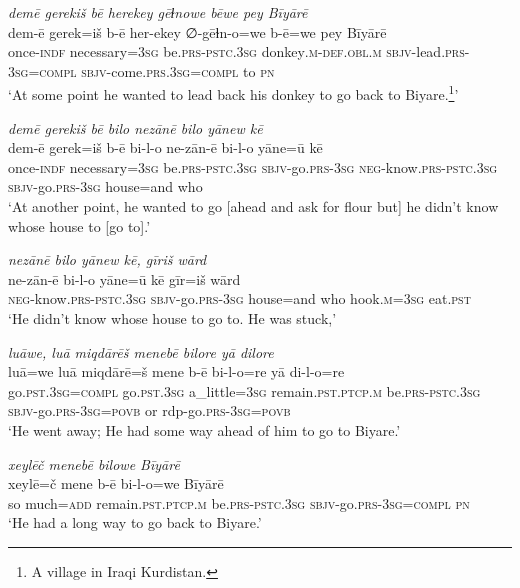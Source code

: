 \ea \label{HB.25}
\textit{demē gerekiš bē herekey gēɫnowe bēwe pey Bīyārē} \\ 
\gll dem-ē gerek=iš b-ē her-ekey ∅-gēɫn-o=we b-ē=we pey Bīyārē \\ 
 once\textsc{-indf} necessary\textsc{=3sg} be\textsc{.prs}\textsc{-pstc}\textsc{.3sg} donkey\textsc{.m}\textsc{-def}\textsc{.obl}\textsc{.m} \textsc{sbjv-}lead\textsc{.prs}\textsc{-3sg}\textsc{=\textsc{compl}} \textsc{sbjv-}come\textsc{.prs}\textsc{.3sg}\textsc{=\textsc{compl}} to \textsc{pn} \\ 
\glt `At some point he wanted to lead back his donkey to go back to Biyare.\footnote{A village in Iraqi Kurdistan.}'
\z 
 
\ea \label{HB.26}
\textit{demē gerekiš bē bilo nezānē bilo yānew kē} \\ 
\gll dem-ē gerek=iš b-ē bi-l-o ne-zān-ē bi-l-o yāne=ū kē \\ 
 once\textsc{-indf} necessary\textsc{=3sg} be\textsc{.prs}\textsc{-pstc}\textsc{.3sg} \textsc{sbjv-}go\textsc{.prs}\textsc{-3sg} \textsc{neg-}know\textsc{.prs}\textsc{-pstc}\textsc{.3sg} \textsc{sbjv-}go\textsc{.prs}\textsc{-3sg} house=and who \\ 
\glt `At another point, he wanted to go [ahead and ask for flour but] he didn’t know whose house to [go to].'
\z 
 
\ea \label{HB.27}
\textit{nezānē bilo yānew kē, gīriš wārd} \\ 
\gll ne-zān-ē bi-l-o yāne=ū kē gīr=iš wārd \\ 
 \textsc{neg-}know\textsc{.prs}\textsc{-pstc}\textsc{.3sg} \textsc{sbjv-}go\textsc{.prs}\textsc{-3sg} house=and who hook\textsc{.m}\textsc{=3sg} eat\textsc{.pst} \\ 
\glt `He didn’t know whose house to go to. He was stuck,'
\z 
 
\ea \label{HB.64}
\textit{luāwe, luā miqdārēš menebē bilore yā dilore} \\ 
\gll luā=we luā miqdārē=š mene b-ē bi-l-o=re yā di-l-o=re \\ 
 go\textsc{.pst}\textsc{.3sg}\textsc{=\textsc{compl}} go\textsc{.pst}\textsc{.3sg} a\_little\textsc{=3sg} remain\textsc{.pst}\textsc{.ptcp}\textsc{.m} be\textsc{.prs}\textsc{-pstc}\textsc{.3sg} \textsc{sbjv-}go\textsc{.prs}\textsc{-3sg}\textsc{=\textsc{povb}} or rdp-go\textsc{.prs}\textsc{-3sg}\textsc{=\textsc{povb}} \\ 
\glt `He went away; He had some way ahead of him to go to Biyare.'
\z 
 
\ea \label{HB.65}
\textit{xeylēč menebē bilowe Bīyārē} \\ 
\gll xeylē=č mene b-ē bi-l-o=we Bīyārē \\ 
 so much\textsc{=add} remain\textsc{.pst}\textsc{.ptcp}\textsc{.m} be\textsc{.prs}\textsc{-pstc}\textsc{.3sg} \textsc{sbjv-}go\textsc{.prs}\textsc{-3sg}\textsc{=\textsc{compl}} \textsc{pn} \\ 
\glt `He had a long way to go back to Biyare.'
\z 
 

